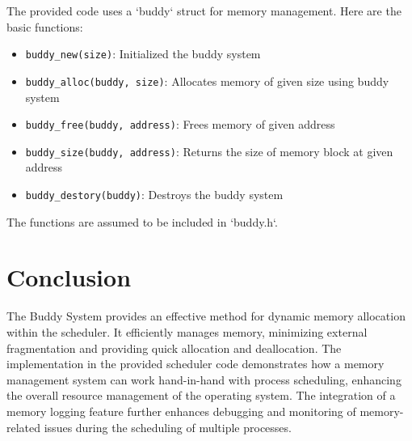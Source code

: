\documentclass{article}
\begin{document}
The provided code uses a `buddy` struct for memory management. Here are the basic functions:

\begin{itemize}
    \item \texttt{buddy\_new(size)}: Initialized the buddy system
    \item \texttt{buddy\_alloc(buddy, size)}: Allocates memory of given size using buddy system
    \item \texttt{buddy\_free(buddy, address)}: Frees memory of given address
    \item \texttt{buddy\_size(buddy, address)}: Returns the size of memory block at given address
    \item \texttt{buddy\_destory(buddy)}: Destroys the buddy system
\end{itemize}
The functions are assumed to be included in `buddy.h`.

\section{Conclusion}

The Buddy System provides an effective method for dynamic memory allocation within the scheduler. It efficiently manages memory, minimizing external fragmentation and providing quick allocation and deallocation. The implementation in the provided scheduler code demonstrates how a memory management system can work hand-in-hand with process scheduling, enhancing the overall resource management of the operating system. The integration of a memory logging feature further enhances debugging and monitoring of memory-related issues during the scheduling of multiple processes.
\end{document}

